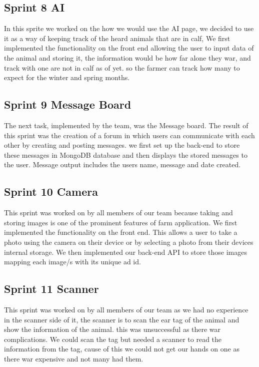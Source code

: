 \documentclass[12pt,a4paper,oneside,openany]{book}
\begin{document}
\subsection{Sprint 8 AI}
In this sprite we worked on the how we would use the AI page, we decided to use it as a way of keeping track of the heard animals that are in calf, We first implemented the functionality on the front end allowing the user to input data of the animal and storing it, the information would be how far alone they war, and track with one are not in calf as of yet. so the farmer can track how many to expect for the winter and spring months.



\subsection{Sprint 9 Message Board }
The next task, implemented by the team, was the Message board. The result of this sprint was the creation of a forum in which users can communicate with each other by creating and posting messages. we first set up the back-end to store these messages in MongoDB database and then displays the stored messages to the user. Message output includes the users name, message and date created.

\subsection{Sprint 10 Camera}
This sprint was worked on by all members of our team because taking and storing images is one of the prominent features of farm application. We first implemented the functionality on the front end. This allows a user to take a photo using the camera on their device or by selecting a photo from their devices internal storage. We then implemented our back-end API to store those images mapping each image/s with its unique ad id.

\subsection{Sprint 11 Scanner}
This sprint was worked on by all members of our team as we had no experience in the scanner side of it, the scanner is to scan the ear tag of the animal and show the information of the animal. this was unsuccessful as there war complications. We could scan the tag but needed a scanner to read the information from the tag, cause of this we could not get our hands on one as there war expensive and not many had them.
\end{document}
